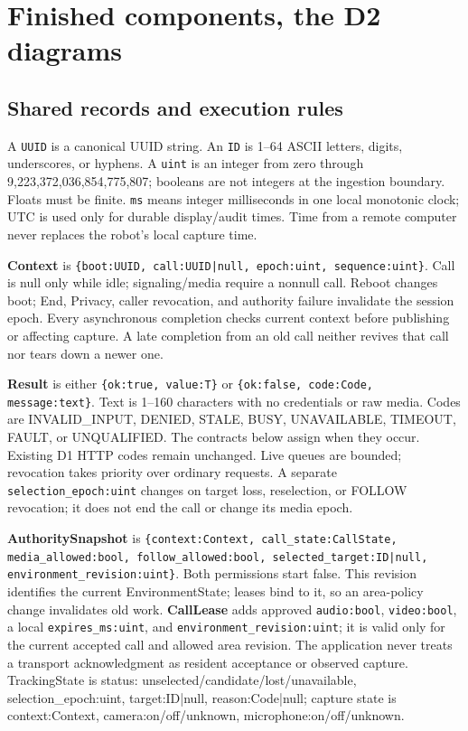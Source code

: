 \documentclass[12pt,letterpaper]{article}
\newcommand{\field}[1]{\texttt{#1}}
\begin{document}
\section{Finished components, the D2 diagrams}

\subsection*{Shared records and execution rules}
A \field{UUID} is a canonical UUID string. An \field{ID} is 1--64 ASCII letters, digits, underscores, or hyphens. A \field{uint} is an integer from zero through 9,223,372,036,854,775,807; booleans are not integers at the ingestion boundary. Floats must be finite. \field{ms} means integer milliseconds in one local monotonic clock; UTC is used only for durable display/audit times. Time from a remote computer never replaces the robot's local capture time.

\textbf{Context} is \field{\{boot:UUID, call:UUID|null, epoch:uint, sequence:uint\}}. Call is null only while idle; signaling/media require a nonnull call. Reboot changes boot; End, Privacy, caller revocation, and authority failure invalidate the session epoch. Every asynchronous completion checks current context before publishing or affecting capture. A late completion from an old call neither revives that call nor tears down a newer one.

\textbf{Result} is either \field{\{ok:true, value:T\}} or \field{\{ok:false, code:Code, message:text\}}. Text is 1--160 characters with no credentials or raw media. Codes are INVALID\_\allowbreak{}INPUT, DENIED, STALE, BUSY, UNAVAILABLE, TIMEOUT, FAULT, or UNQUALIFIED. The contracts below assign when they occur. Existing D1 HTTP codes remain unchanged. Live queues are bounded; revocation takes priority over ordinary requests. A separate \field{selection\_\allowbreak{}epoch:uint} changes on target loss, reselection, or FOLLOW revocation; it does not end the call or change its media epoch.

\textbf{AuthoritySnapshot} is \field{\{context:Context, call\_\allowbreak{}state:CallState, media\_\allowbreak{}allowed:bool, follow\_\allowbreak{}allowed:bool, selected\_\allowbreak{}target:ID|null, environment\_\allowbreak{}revision:uint\}}. Both permissions start false. This revision identifies the current EnvironmentState; leases bind to it, so an area-policy change invalidates old work. \textbf{CallLease} adds approved \field{audio:bool}, \field{video:bool}, a local \field{expires\_\allowbreak{}ms:uint}, and \field{environment\_\allowbreak{}revision:uint}; it is valid only for the current accepted call and allowed area revision. The application never treats a transport acknowledgment as resident acceptance or observed capture. TrackingState is {status: unselected/candidate/lost/unavailable, selection\_\allowbreak{}epoch:uint, target:ID|null, reason:Code|null}; capture state is {context:Context, camera:on/off/unknown, microphone:on/off/unknown}.
\end{document}
